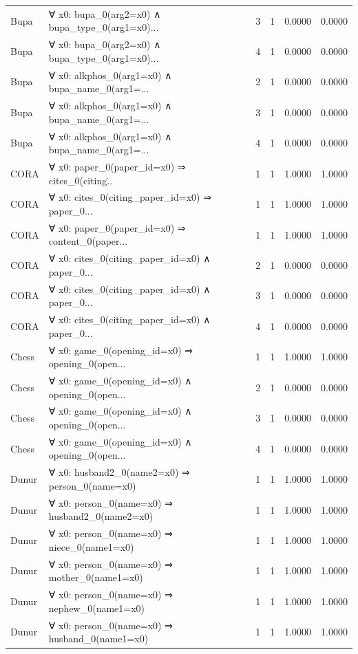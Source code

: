 \documentclass[11pt,a4paper]{article}
\begin{document}
\begin{table}[h!]
\begin{longtable}{|l|p{6cm}|c|c|c|c|}
Bupa & ∀ x0: bupa\_0(arg2=x0) ∧ bupa\_type\_0(arg1=x0)... & 3 & 1 & 0.0000 & 0.0000 \\
Bupa & ∀ x0: bupa\_0(arg2=x0) ∧ bupa\_type\_0(arg1=x0)... & 4 & 1 & 0.0000 & 0.0000 \\
Bupa & ∀ x0: alkphos\_0(arg1=x0) ∧ bupa\_name\_0(arg1=... & 2 & 1 & 0.0000 & 0.0000 \\
Bupa & ∀ x0: alkphos\_0(arg1=x0) ∧ bupa\_name\_0(arg1=... & 3 & 1 & 0.0000 & 0.0000 \\
Bupa & ∀ x0: alkphos\_0(arg1=x0) ∧ bupa\_name\_0(arg1=... & 4 & 1 & 0.0000 & 0.0000 \\
CORA & ∀ x0: paper\_0(paper\_id=x0) ⇒ cites\_0(citing\... & 1 & 1 & 1.0000 & 1.0000 \\
CORA & ∀ x0: cites\_0(citing\_paper\_id=x0) ⇒ paper\_0... & 1 & 1 & 1.0000 & 1.0000 \\
CORA & ∀ x0: paper\_0(paper\_id=x0) ⇒ content\_0(paper... & 1 & 1 & 1.0000 & 1.0000 \\
CORA & ∀ x0: cites\_0(citing\_paper\_id=x0) ∧ paper\_0... & 2 & 1 & 0.0000 & 0.0000 \\
CORA & ∀ x0: cites\_0(citing\_paper\_id=x0) ∧ paper\_0... & 3 & 1 & 0.0000 & 0.0000 \\
CORA & ∀ x0: cites\_0(citing\_paper\_id=x0) ∧ paper\_0... & 4 & 1 & 0.0000 & 0.0000 \\
Chess & ∀ x0: game\_0(opening\_id=x0) ⇒ opening\_0(open... & 1 & 1 & 1.0000 & 1.0000 \\
Chess & ∀ x0: game\_0(opening\_id=x0) ∧ opening\_0(open... & 2 & 1 & 0.0000 & 0.0000 \\
Chess & ∀ x0: game\_0(opening\_id=x0) ∧ opening\_0(open... & 3 & 1 & 0.0000 & 0.0000 \\
Chess & ∀ x0: game\_0(opening\_id=x0) ∧ opening\_0(open... & 4 & 1 & 0.0000 & 0.0000 \\
Dunur & ∀ x0: husband2\_0(name2=x0) ⇒ person\_0(name=x0) & 1 & 1 & 1.0000 & 1.0000 \\
Dunur & ∀ x0: person\_0(name=x0) ⇒ husband2\_0(name2=x0) & 1 & 1 & 1.0000 & 1.0000 \\
Dunur & ∀ x0: person\_0(name=x0) ⇒ niece\_0(name1=x0) & 1 & 1 & 1.0000 & 1.0000 \\
Dunur & ∀ x0: person\_0(name=x0) ⇒ mother\_0(name1=x0) & 1 & 1 & 1.0000 & 1.0000 \\
Dunur & ∀ x0: person\_0(name=x0) ⇒ nephew\_0(name1=x0) & 1 & 1 & 1.0000 & 1.0000 \\
Dunur & ∀ x0: person\_0(name=x0) ⇒ husband\_0(name1=x0) & 1 & 1 & 1.0000 & 1.0000 \\

\end{longtable}
\end{table}
\end{document}
